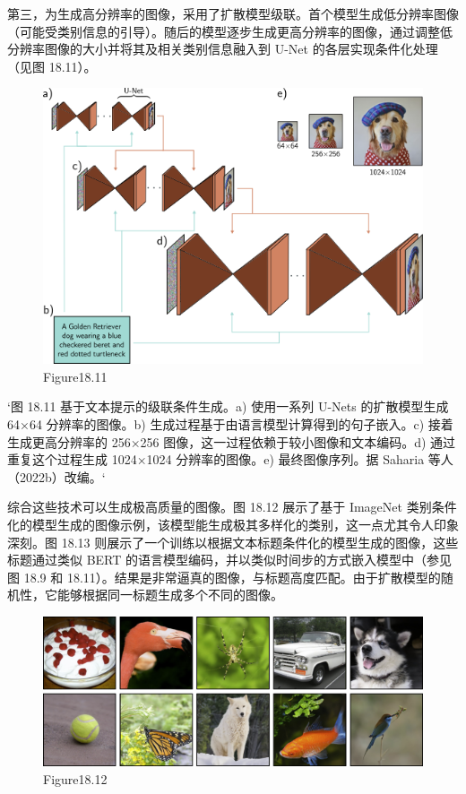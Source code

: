 第三，为生成高分辨率的图像，采用了扩散模型级联。首个模型生成低分辨率图像（可能受类别信息的引导）。随后的模型逐步生成更高分辨率的图像，通过调整低分辨率图像的大小并将其及相关类别信息融入到 U-Net 的各层实现条件化处理（见图 18.11）。

\begin{figure}[ht!]
\centering
\includegraphics[width=0.7\linewidth]{png/chapter18/DiffusionCascade.png}
\caption{Figure18.11}
\end{figure}

`图 18.11 基于文本提示的级联条件生成。a) 使用一系列 U-Nets 的扩散模型生成 64×64 分辨率的图像。b) 生成过程基于由语言模型计算得到的句子嵌入。c) 接着生成更高分辨率的 256×256 图像，这一过程依赖于较小图像和文本编码。d) 通过重复这个过程生成 1024×1024 分辨率的图像。e) 最终图像序列。据 Saharia 等人（2022b）改编。`

综合这些技术可以生成极高质量的图像。图 18.12 展示了基于 ImageNet 类别条件化的模型生成的图像示例，该模型能生成极其多样化的类别，这一点尤其令人印象深刻。图 18.13 则展示了一个训练以根据文本标题条件化的模型生成的图像，这些标题通过类似 BERT 的语言模型编码，并以类似时间步的方式嵌入模型中（参见图 18.9 和 18.11）。结果是非常逼真的图像，与标题高度匹配。由于扩散模型的随机性，它能够根据同一标题生成多个不同的图像。

\begin{figure}[ht!]
\centering
\includegraphics[width=0.7\linewidth]{png/chapter18/DiffusionConditional.png}
\caption{Figure18.12}
\end{figure}

